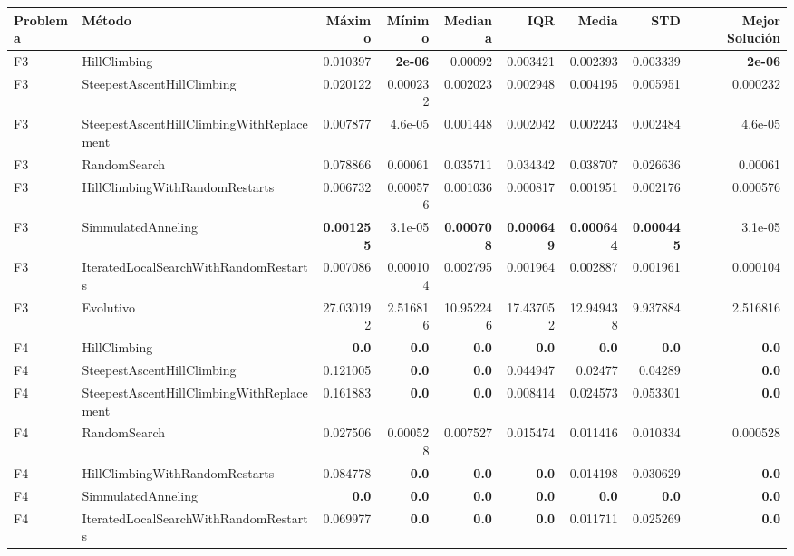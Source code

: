 \begin{tabular}{llrrrrrrr}
\toprule
Problema & Método & Máximo & Mínimo & Mediana & IQR & Media & STD & Mejor Solución \\ 
\midrule
F3 & HillClimbing & 0.010397 & \textbf{2e-06} & 0.00092 & 0.003421 & 0.002393 & 0.003339 & \textbf{2e-06} \\ 
F3 & SteepestAscentHillClimbing & 0.020122 & 0.000232 & 0.002023 & 0.002948 & 0.004195 & 0.005951 & 0.000232 \\ 
F3 & SteepestAscentHillClimbingWithReplacement & 0.007877 & 4.6e-05 & 0.001448 & 0.002042 & 0.002243 & 0.002484 & 4.6e-05 \\ 
F3 & RandomSearch & 0.078866 & 0.00061 & 0.035711 & 0.034342 & 0.038707 & 0.026636 & 0.00061 \\ 
F3 & HillClimbingWithRandomRestarts & 0.006732 & 0.000576 & 0.001036 & 0.000817 & 0.001951 & 0.002176 & 0.000576 \\ 
F3 & SimmulatedAnneling & \textbf{0.001255} & 3.1e-05 & \textbf{0.000708} & \textbf{0.000649} & \textbf{0.000644} & \textbf{0.000445} & 3.1e-05 \\ 
F3 & IteratedLocalSearchWithRandomRestarts & 0.007086 & 0.000104 & 0.002795 & 0.001964 & 0.002887 & 0.001961 & 0.000104 \\ 
F3 & Evolutivo & 27.030192 & 2.516816 & 10.952246 & 17.437052 & 12.949438 & 9.937884 & 2.516816 \\ 
\midrule
F4 & HillClimbing & \textbf{0.0} & \textbf{0.0} & \textbf{0.0} & \textbf{0.0} & \textbf{0.0} & \textbf{0.0} & \textbf{0.0} \\ 
F4 & SteepestAscentHillClimbing & 0.121005 & \textbf{0.0} & \textbf{0.0} & 0.044947 & 0.02477 & 0.04289 & \textbf{0.0} \\ 
F4 & SteepestAscentHillClimbingWithReplacement & 0.161883 & \textbf{0.0} & \textbf{0.0} & 0.008414 & 0.024573 & 0.053301 & \textbf{0.0} \\ 
F4 & RandomSearch & 0.027506 & 0.000528 & 0.007527 & 0.015474 & 0.011416 & 0.010334 & 0.000528 \\ 
F4 & HillClimbingWithRandomRestarts & 0.084778 & \textbf{0.0} & \textbf{0.0} & \textbf{0.0} & 0.014198 & 0.030629 & \textbf{0.0} \\ 
F4 & SimmulatedAnneling & \textbf{0.0} & \textbf{0.0} & \textbf{0.0} & \textbf{0.0} & \textbf{0.0} & \textbf{0.0} & \textbf{0.0} \\ 
F4 & IteratedLocalSearchWithRandomRestarts & 0.069977 & \textbf{0.0} & \textbf{0.0} & \textbf{0.0} & 0.011711 & 0.025269 & \textbf{0.0} \\ 

\end{tabular}
